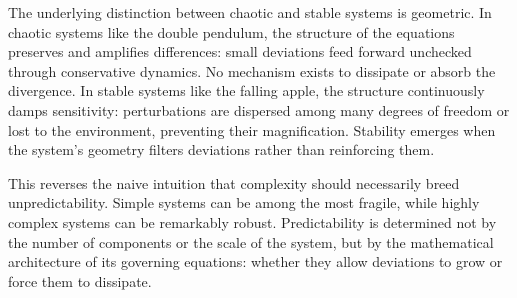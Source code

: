 The underlying distinction between chaotic and stable systems is geometric. In chaotic systems like the double pendulum, the structure of the equations preserves and amplifies differences: small deviations feed forward unchecked through conservative dynamics. No mechanism exists to dissipate or absorb the divergence. In stable systems like the falling apple, the structure continuously damps sensitivity: perturbations are dispersed among many degrees of freedom or lost to the environment, preventing their magnification. Stability emerges when the system’s geometry filters deviations rather than reinforcing them.

This reverses the naive intuition that complexity should necessarily breed unpredictability. Simple systems can be among the most fragile, while highly complex systems can be remarkably robust. Predictability is determined not by the number of components or the scale of the system, but by the mathematical architecture of its governing equations: whether they allow deviations to grow or force them to dissipate.
